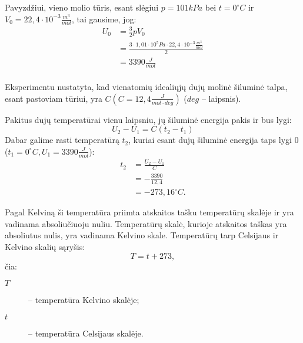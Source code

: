 Pavyzdžiui, vieno molio tūris, esant slėgiui $p = 101 kPa$ bei
$t = 0^{\circ}C$ ir $V_{0} = 22,4 \cdot 10^{-3} \frac{m^{3}}{mol}$,
tai gausime, jog:
\begin{align*}
  U_{0}
  &= \frac{3}{2} p V_{0} \\
  &= \frac{3 \cdot 1,01 \cdot 10^{5} Pa \cdot 22,4
    \cdot 10^{-3}\frac{m^{3}}{mol}}{2} \\
  &= 3390 \frac{J}{mol} \\
\end{align*}

Eksperimentu nustatyta, kad vienatomių idealiųjų dujų molinė šiluminė
talpa, esant pastoviam tūriui, yra $C (C=12,4 \frac{J}{mol \cdot deg})$
($deg$ – laipsnis).

Pakitus dujų temperatūrai vienu laipsniu, jų šiluminė energija pakis
ir bus lygi:
\begin{equation}
  U_{2} - U_{1} = C (t_{2} - t_{1})
  \label{eq:dujos_DU}
\end{equation}
Dabar galime rasti temperatūrą $t_{2}$, kuriai esant dujų šiluminė
energija taps lygi 0 ($t_{1} = 0^{\circ} C, U_{1} = 3390 \frac{J}{mol}$):
\begin{align*}
  t_{2}
  &= \frac{U_{2} - U_{1}}{C} \\
  &= - \frac{3390}{12,4} \\
  &= -273,16^{\circ} C.
\end{align*}

Pagal Kelviną ši temperatūra priimta atskaitos tašku temperatūrų skalėje
ir yra vadinama absoliučiuoju nuliu. Temperatūrų skalė, kurioje atskaitos
taškas yra absoliutus nulis, yra vadinama Kelvino skale.
Temperatūrų tarp Celsijaus ir Kelvino skalių sąryšis:
\begin{equation*}
  T = t + 273,
\end{equation*}
čia:
\begin{description}
  \item[$T$] – temperatūra Kelvino skalėje;
  \item[$t$] – temperatūra Celsijaus skalėje.
\end{description}

